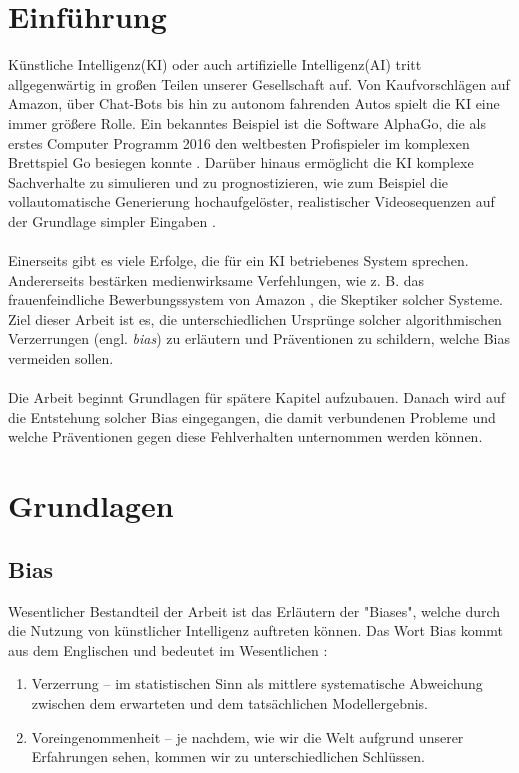 \documentclass[12pt,oneside,a4paper,parskip]{scrbook}
\begin{document}
\chapter{Einführung}
\label{chapter:intro}
Künstliche Intelligenz(KI) oder auch artifizielle Intelligenz(AI) tritt allgegenwärtig in großen Teilen unserer Gesellschaft auf. Von Kaufvorschlägen auf Amazon, über Chat-Bots bis hin zu autonom fahrenden Autos spielt die KI eine immer größere Rolle. Ein bekanntes Beispiel ist die Software AlphaGo, die als erstes Computer Programm 2016 den weltbesten Profispieler im komplexen Brettspiel Go besiegen konnte \cite{alphaGo}. Darüber hinaus ermöglicht die KI komplexe Sachverhalte zu simulieren und zu prognostizieren, wie zum Beispiel die vollautomatische Generierung hochaufgelöster, realistischer Videosequenzen auf der Grundlage simpler Eingaben \cite{videoToVideo}.
\\\\
Einerseits gibt es viele Erfolge, die für ein KI betriebenes System sprechen. Andererseits bestärken medienwirksame Verfehlungen, wie z. B. das frauenfeindliche Bewerbungssystem von Amazon \cite{amazon}, die Skeptiker solcher Systeme. Ziel dieser Arbeit ist es, die unterschiedlichen Ursprünge solcher algorithmischen Verzerrungen (engl. \textit{bias}) zu erläutern und Präventionen zu schildern, welche Bias vermeiden sollen.
\\\\
Die Arbeit beginnt Grundlagen für spätere Kapitel aufzubauen. Danach wird auf die Entstehung solcher Bias eingegangen, die damit verbundenen Probleme und welche Präventionen gegen diese Fehlverhalten unternommen werden können.
\chapter{Grundlagen}
\section{Bias}
Wesentlicher Bestandteil der Arbeit ist das Erläutern der "Biases", welche durch die Nutzung von künstlicher Intelligenz auftreten können. Das Wort Bias kommt aus dem Englischen und bedeutet im Wesentlichen \cite{biasEffekt}:
\begin{enumerate}
	\item Verzerrung – im statistischen Sinn als mittlere systematische Abweichung zwischen dem erwarteten und dem tatsächlichen Modellergebnis.
	\item Voreingenommenheit – je nachdem, wie wir die Welt aufgrund unserer Erfahrungen sehen, kommen wir zu unterschiedlichen Schlüssen. 
\end{enumerate}
\end{document}
